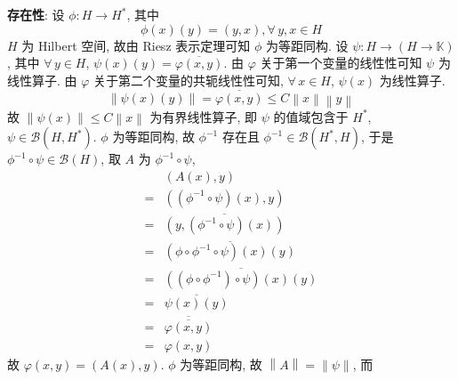 \documentclass[\ROOT/main.tex]{subfiles}
\begin{document}
\noindent \textbf{存在性}:
设 $\phi : H \to H^*$, 其中
\[
    \phi \left( x \right) \left( y \right) = \left( y, x \right)
    , \forall \, y, x \in H
\]
$H$ 为 Hilbert 空间, 故由 Riesz 表示定理可知 $\phi$ 为等距同构.
设 $\psi : H \to \left( H \to \mathbb{K} \right)$, 其中 $\forall \, y \in H$, $\psi \left( x \right) \left( y \right) = \overline{\varphi \left( x, y \right)}$.
由 $\varphi$ 关于第一个变量的线性性可知 $\psi$ 为线性算子.
由 $\varphi$ 关于第二个变量的共轭线性性可知, $\forall \, x \in H$, $\psi \left( x \right)$ 为线性算子.
\[
    \left\| \psi \left( x \right) \left( y \right) \right\|
    =
    \overline{\varphi \left( x, y \right)}
    \leqslant
    C \left\| x \right\| \left\| y \right\|
\]
故 $\left\| \psi \left( x \right) \right\| \leqslant C \left\| x \right\|$ 为有界线性算子,
即 $\psi$ 的值域包含于 $H^*$, $\psi \in \mathscr{B} \left( H, H^* \right)$.
$\phi$ 为等距同构, 故 $\phi^{-1}$ 存在且 $\phi^{-1} \in \mathscr{B} \left( H^*, H \right)$,
于是 $\phi^{-1} \circ \psi \in \mathscr{B} \left( H \right)$,
取 $A$ 为 $\phi^{-1} \circ \psi$,
\begin{align*}
     & \left( A \left( x \right), y \right) \\
    =& \left( \left( \phi^{-1} \circ \psi \right) \left( x \right), y \right) \\
    =& \overline{\left( y, \left( \phi^{-1} \circ \psi \right) \left( x \right) \right)} \\
    =& \overline{\left( \phi \circ \phi^{-1} \circ \psi \right) \left( x \right) \left( y \right)} \\
    =& \overline{\left( \left( \phi \circ \phi^{-1} \right) \circ \psi \right) \left( x \right) \left( y \right)} \\
    =& \overline{\psi \left( x \right) \left( y \right)} \\
    =& \overline{\overline{\varphi \left( x, y \right)}} \\
    =& \varphi \left( x, y \right)
\end{align*}
故 $\varphi \left( x, y \right) = \left( A \left( x \right), y \right)$.
$\phi$ 为等距同构, 故 $\left\| A \right\| = \left\| \psi \right\|$, 而
\end{document}
